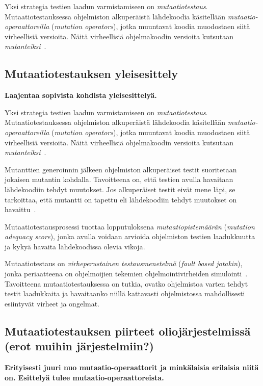 \documentclass[finnish, grading]{tktltiki2}
\theoremstyle{definition}
\theoremstyle{remark}
\begin{document}
Yksi strategia testien laadun varmistamiseen on \textit{mutaatiotestaus}. Mutaatiotestauksessa ohjelmiston alkuperäistä lähdekoodia käsitellään \textit{mutaatio-operaattoreilla} (\textit{mutation operators}), jotka muuntavat koodia muodostaen siitä virheellisiä versioita. Näitä virheellisiä ohjelmakoodin versioita kutsutaan \textit{mutanteiksi}~\cite[s. 869]{Ma:Harrold:Kwon:2006}. 

\subsection{Mutaatiotestauksen yleisesittely}

\textbf{Laajentaa sopivista kohdista yleisesittelyä.}

Yksi strategia testien laadun varmistamiseen on \textit{mutaatiotestaus}. Mutaatiotestauksessa ohjelmiston alkuperäistä lähdekoodia käsitellään \textit{mutaatio-operaattoreilla} (\textit{mutation operators}), jotka muuntavat koodia muodostaen siitä virheellisiä versioita. Näitä virheellisiä ohjelmakoodin versioita kutsutaan \textit{mutanteiksi}~\cite[s. 869]{Ma:Harrold:Kwon:2006}. 

Mutanttien generoinnin jälkeen ohjelmiston alkuperäiset testit suoritetaan jokaisen mutantin kohdalla. Tavoitteena on, että testien avulla havaitaan lähdekoodiin tehdyt muutokset. Jos alkuperäiset testit eivät mene läpi, se tarkoittaa, että mutantti on tapettu eli lähdekoodiin tehdyt muutokset on havaittu~\cite[s. 9]{Kim:Clark:McDermid:2000}. 

Mutaatiotestausprosessi tuottaa lopputuloksena \textit{mutaatiopistemäärän} (\textit{mutation adequacy score}), jonka avulla voidaan arvioida ohjelmiston testien laadukkuutta ja kykyä havaita lähdekoodissa olevia vikoja. 

Mutaatiotestaus on \textit{virheperustainen testausmenetelmä} (\textit{fault based jotakin}), jonka periaatteena on ohjelmoijien tekemien ohjelmointivirheiden simulointi~\cite[s. 649]{Jia:Harman:2011}. Tavoitteena mutaatiotestauksessa on tutkia, ovatko ohjelmistoa varten tehdyt testit laadukkaita ja havaitaanko niillä kattavasti ohjelmistossa mahdollisesti esiintyvät virheet ja ongelmat. 


\subsection{Mutaatiotestauksen piirteet oliojärjestelmissä (erot muihin järjestelmiin?)}

\textbf{Erityisesti juuri nuo mutaatio-operaattorit ja minkälaisia erilaisia niitä on. Esittelyä tulee mutaatio-operaattoreista.}
\end{document}
